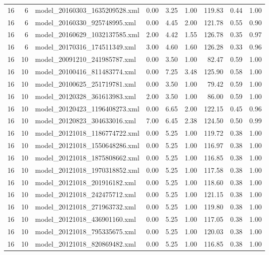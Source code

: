 \begin{table}[ht]
\begin{tabular}{rrlrrrrrr}
   16 &   6 & model\_20160303\_1635209528.xml & 0.00 & 3.25 & 1.00 & 119.83 & 0.44 & 1.00 \\ 
   16 &   6 & model\_20160330\_925748995.xml & 0.00 & 4.45 & 2.00 & 121.78 & 0.55 & 0.90 \\ 
   16 &   6 & model\_20160629\_1032137585.xml & 2.00 & 4.42 & 1.55 & 126.78 & 0.35 & 0.97 \\ 
   16 &   6 & model\_20170316\_174511349.xml & 3.00 & 4.60 & 1.60 & 126.28 & 0.33 & 0.96 \\ 
   16 &  10 & model\_20091210\_241985787.xml & 0.00 & 3.50 & 1.00 & 82.47 & 0.59 & 1.00 \\ 
   16 &  10 & model\_20100416\_811483774.xml & 0.00 & 7.25 & 3.48 & 125.90 & 0.58 & 1.00 \\ 
   16 &  10 & model\_20100625\_251719781.xml & 0.00 & 3.50 & 1.00 & 79.42 & 0.59 & 1.00 \\ 
   16 &  10 & model\_20120328\_361613983.xml & 2.00 & 3.50 & 1.00 & 86.00 & 0.59 & 1.00 \\ 
   16 &  10 & model\_20120423\_1196408273.xml & 0.00 & 6.65 & 2.00 & 122.15 & 0.45 & 0.96 \\ 
   16 &  10 & model\_20120823\_304633016.xml & 7.00 & 6.45 & 2.38 & 124.50 & 0.50 & 0.99 \\ 
   16 &  10 & model\_20121018\_1186774722.xml & 0.00 & 5.25 & 1.00 & 119.72 & 0.38 & 1.00 \\ 
   16 &  10 & model\_20121018\_1550648286.xml & 0.00 & 5.25 & 1.00 & 116.97 & 0.38 & 1.00 \\ 
   16 &  10 & model\_20121018\_1875808662.xml & 0.00 & 5.25 & 1.00 & 116.85 & 0.38 & 1.00 \\ 
   16 &  10 & model\_20121018\_1970318852.xml & 0.00 & 5.25 & 1.00 & 117.58 & 0.38 & 1.00 \\ 
   16 &  10 & model\_20121018\_201916182.xml & 0.00 & 5.25 & 1.00 & 118.60 & 0.38 & 1.00 \\ 
   16 &  10 & model\_20121018\_242475712.xml & 0.00 & 5.25 & 1.00 & 121.15 & 0.38 & 1.00 \\ 
   16 &  10 & model\_20121018\_271963732.xml & 0.00 & 5.25 & 1.00 & 119.80 & 0.38 & 1.00 \\ 
   16 &  10 & model\_20121018\_436901160.xml & 0.00 & 5.25 & 1.00 & 117.05 & 0.38 & 1.00 \\ 
   16 &  10 & model\_20121018\_795335675.xml & 0.00 & 5.25 & 1.00 & 120.03 & 0.38 & 1.00 \\ 
   16 &  10 & model\_20121018\_820869482.xml & 0.00 & 5.25 & 1.00 & 116.85 & 0.38 & 1.00 \\ 

\end{tabular}
\end{table}

